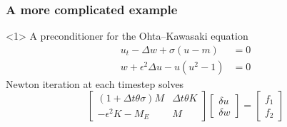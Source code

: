\documentclass[presentation,aspectratio=43]{beamer}
\begin{document}
\begin{frame}
  \frametitle{A more complicated example}
  \begin{onlyenv}<1> A preconditioner for the Ohta--Kawasaki equation
    \parencite{Farrell:2017}
    \begin{equation*}
      \begin{split}
        u_t - \Delta w + \sigma(u - m) &= 0\\
        w + \epsilon^2 \Delta u - u(u^2 - 1) &= 0
      \end{split}
    \end{equation*}
    Newton iteration at each timestep solves
    \begin{equation*}
      \begin{bmatrix}
        (1 + \Delta t \theta \sigma)M  & \Delta t\theta K \\
        -\epsilon^2 K - M_E & M
      \end{bmatrix}
      \begin{bmatrix}
        \delta u \\
        \delta w
      \end{bmatrix} =
      \begin{bmatrix}
        f_1 \\
        f_2
      \end{bmatrix}
    \end{equation*}
  \end{onlyenv}


\end{frame}
\end{document}
